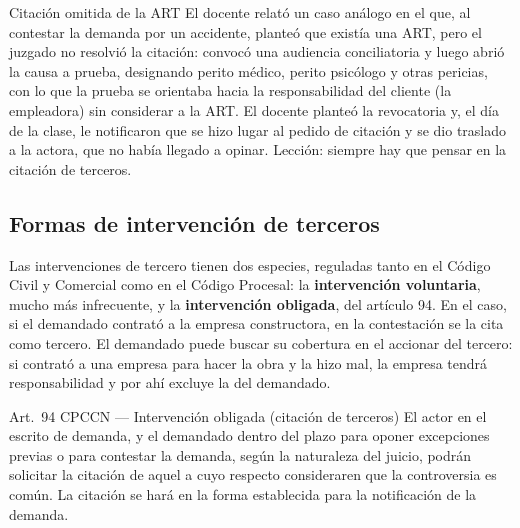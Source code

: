 \documentclass[12pt,oneside]{book}
\begin{document}
\begin{example}{Citaci\'on omitida de la ART}
El docente relat\'o un caso an\'alogo en el que, al contestar la demanda por un accidente, plante\'o que exist\'ia una ART, pero el juzgado no resolvi\'o la citaci\'on: convoc\'o una audiencia conciliatoria y luego abri\'o la causa a prueba, designando perito m\'edico, perito psic\'ologo y otras pericias, con lo que la prueba se orientaba hacia la responsabilidad del cliente (la empleadora) sin considerar a la ART. El docente plante\'o la revocatoria y, el d\'ia de la clase, le notificaron que se hizo lugar al pedido de citaci\'on y se dio traslado a la actora, que no hab\'ia llegado a opinar. Lecci\'on: siempre hay que pensar en la citaci\'on de terceros.
\end{example}

\subsection{Formas de intervenci\'on de terceros}

Las intervenciones de tercero tienen dos especies, reguladas tanto en el C\'odigo Civil y Comercial como en el C\'odigo Procesal: la \textbf{intervenci\'on voluntaria}, mucho m\'as infrecuente, y la \textbf{intervenci\'on obligada}, del art\'iculo 94. En el caso, si el demandado contrat\'o a la empresa constructora, en la contestaci\'on se la cita como tercero. El demandado puede buscar su cobertura en el accionar del tercero: si contrat\'o a una empresa para hacer la obra y la hizo mal, la empresa tendr\'a responsabilidad y por ah\'i excluye la del demandado.

\begin{norma}{Art.~94 CPCCN --- Intervenci\'on obligada (citaci\'on de terceros)}
El actor en el escrito de demanda, y el demandado dentro del plazo para oponer excepciones previas o para contestar la demanda, seg\'un la naturaleza del juicio, podr\'an solicitar la citaci\'on de aquel a cuyo respecto consideraren que la controversia es com\'un. La citaci\'on se har\'a en la forma establecida para la notificaci\'on de la demanda.
\end{norma}
\end{document}
